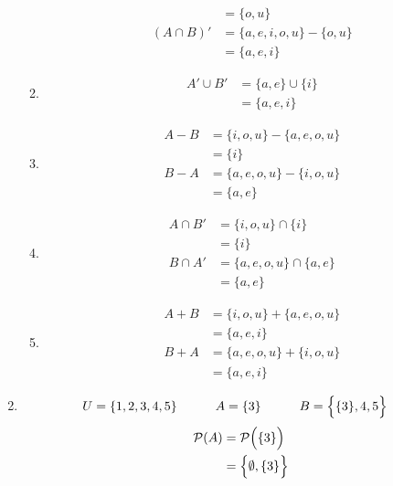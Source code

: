 \documentclass[../notes.tex]{subfiles}
\begin{document}
\begin{enumerate}
\begin{enumerate}[label=(\alph*)]
\begin{align*}
                &= \{o, u\}\\
                (A \cap B)' &= \{a, e, i, o, u\} - \{o, u\}\\
                &= \{a, e, i\}
              \end{align*}
            \item
              \begin{align*}
                A' \cup B' &= \{a, e\} \cup \{i\}\\
                &= \{a, e, i\}
              \end{align*}
            \item
              \begin{align*}
                A - B &= \{i, o, u\} - \{a, e, o, u\}\\
                &= \{i\}\\
                B - A &= \{a, e, o, u\} - \{i, o, u\}\\
                &= \{a,e\}
              \end{align*}
            \item
              \begin{align*}
                A \cap B' &= \{i, o, u\} \cap \{i\}\\
                &= \{i\}\\
                B \cap A' &= \{a, e, o, u\} \cap \{a, e\}\\
                &= \{a, e\}
              \end{align*}
            \item
              \begin{align*}
                A + B &= \{i, o, u\} + \{a, e, o, u\}\\
                &= \{a, e, i\}\\
                B + A &= \{a, e, o, u\} + \{i, o, u\}\\
                &= \{a, e, i\}
              \end{align*}
          \end{enumerate}
        \item
          \begin{alignat*}{3}
            U &= \{1, 2, 3, 4, 5\} \qquad & A &= \{3\} \qquad & B &= \Bigl\{\{3\}, 4, 5\Bigr\}
          \end{alignat*}
          \begin{align*}
            \mathcal{P}(A) &= \mathcal{P}\Bigl(\{3\}\Bigr)\\
            &= \Bigl\{\emptyset, \{3\}\Bigr\}\\

\end{align*}
\end{enumerate}
\end{document}
